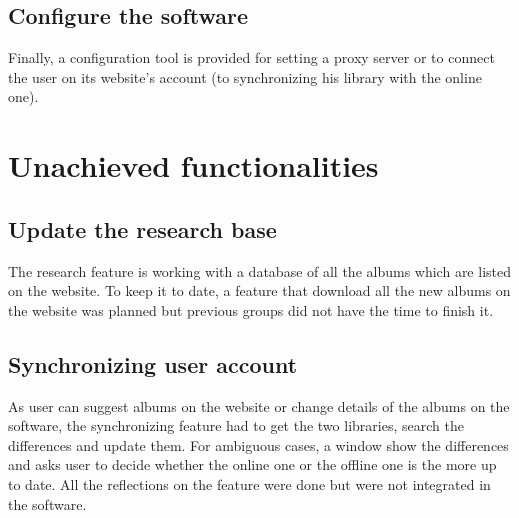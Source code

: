 \documentclass[11pt]{report} %
\begin{document}
\subsection{Configure the software}
Finally, a configuration tool is provided for setting a proxy server or to connect the user on its website's account (to synchronizing his library with the online one).

\section{Unachieved functionalities}
\subsection{Update the research base}
The research feature is working with a database of all the albums which are listed on the website. To keep it to date, a feature that download all the new albums on the website was planned but previous groups did not have the time to finish it.

\subsection{Synchronizing user account}
As user can suggest albums on the website or change details of the albums on the software, the synchronizing feature had to get the two libraries, search the differences and update them. For ambiguous cases, a window show the differences and asks user to decide whether the online one or the offline one is the more up to date. All the reflections on the feature were done but were not integrated in the software.
\end{document}
